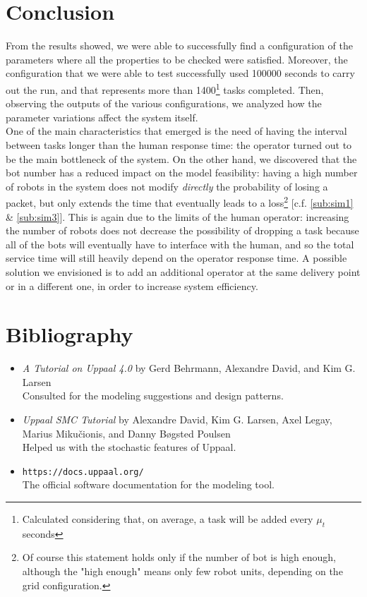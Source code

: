 \documentclass{article}
\begin{document}
	\section{Conclusion}
		From the results showed, we were able to successfully find a configuration of the parameters where all the properties to be checked were satisfied. Moreover, the configuration that we were able to test successfully used 100000 seconds to carry out the run, and that represents more than 1400\footnote{Calculated considering that, on average, a task will be added every $\mu_t$ seconds} tasks completed. %
		Then, observing the outputs of the various configurations, we analyzed how the parameter variations affect the system itself.\\
		One of the main characteristics that emerged is the need of having the interval between tasks longer than the human response time: the operator turned out to be the main bottleneck of the system.
		On the other hand, we discovered that the bot number has a reduced impact on the model feasibility: having a high number of robots in the system does not modify \emph{directly} the probability of losing a packet, but only extends the time that eventually leads to a loss\footnote{Of course this statement holds only if the number of bot is high enough, although the "high enough" means only few robot units, depending on the grid configuration.} [c.f. \ref{sub:sim1} \& \ref{sub:sim3}]. This is again due to the limits of the human operator: increasing the number of robots does not decrease the possibility of dropping a task because all of the bots will eventually have to interface with the human, and so the total service time will still heavily depend on the operator response time. A possible solution we envisioned is to add an additional operator at the same delivery point or in a different one, in order to increase system efficiency. 

	\section{Bibliography}
		\begin{itemize}
			\item \emph{A Tutorial on Uppaal 4.0} by Gerd Behrmann, Alexandre David, and Kim G. Larsen \\
				Consulted for the modeling suggestions and design patterns.
			\item \emph{Uppaal SMC Tutorial} by Alexandre David, Kim G. Larsen, Axel Legay, Marius Mikučionis, and Danny Bøgsted Poulsen \\
				Helped us with the stochastic features of Uppaal.
			\item \verb|https://docs.uppaal.org/| \\ The official software documentation for the modeling tool.
		\end{itemize}
		
\end{document}
